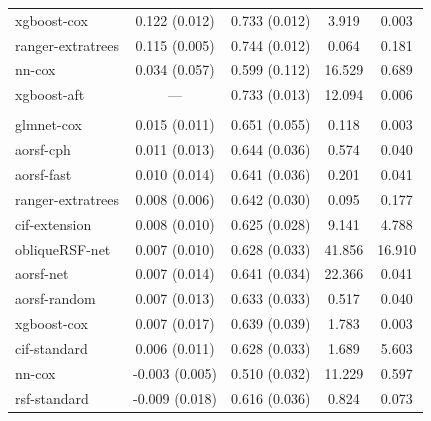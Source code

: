 \documentclass{article}\usepackage[]{graphicx}\usepackage[]{xcolor}
\newenvironment{knitrout}{}{} %
\begin{document}
\begin{knitrout}
\begin{longtable}[t]{lcccc}
\hspace{1em}xgboost-cox & 0.122 (0.012) & 0.733 (0.012) & 3.919 & 0.003\\
\hspace{1em}ranger-extratrees & 0.115 (0.005) & 0.744 (0.012) & 0.064 & 0.181\\
\hspace{1em}nn-cox & 0.034 (0.057) & 0.599 (0.112) & 16.529 & 0.689\\
\hspace{1em}xgboost-aft & --- & 0.733 (0.013) & 12.094 & 0.006\\
\addlinespace[0.3em]
\multicolumn{5}{l}{\textit{\textbf{Monoclonal gammopathy; malignancy, n = 1384, p = 8}}}\\
\hline
\hspace{1em}glmnet-cox & 0.015 (0.011) & 0.651 (0.055) & 0.118 & 0.003\\
\hspace{1em}aorsf-cph & 0.011 (0.013) & 0.644 (0.036) & 0.574 & 0.040\\
\hspace{1em}aorsf-fast & 0.010 (0.014) & 0.641 (0.036) & 0.201 & 0.041\\
\hspace{1em}ranger-extratrees & 0.008 (0.006) & 0.642 (0.030) & 0.095 & 0.177\\
\hspace{1em}cif-extension & 0.008 (0.010) & 0.625 (0.028) & 9.141 & 4.788\\
\hspace{1em}obliqueRSF-net & 0.007 (0.010) & 0.628 (0.033) & 41.856 & 16.910\\
\hspace{1em}aorsf-net & 0.007 (0.014) & 0.641 (0.034) & 22.366 & 0.041\\
\hspace{1em}aorsf-random & 0.007 (0.013) & 0.633 (0.033) & 0.517 & 0.040\\
\hspace{1em}xgboost-cox & 0.007 (0.017) & 0.639 (0.039) & 1.783 & 0.003\\
\hspace{1em}cif-standard & 0.006 (0.011) & 0.628 (0.033) & 1.689 & 5.603\\
\hspace{1em}nn-cox & -0.003 (0.005) & 0.510 (0.032) & 11.229 & 0.597\\
\hspace{1em}rsf-standard & -0.009 (0.018) & 0.616 (0.036) & 0.824 & 0.073\\

\end{longtable}
\end{knitrout}
\end{document}
